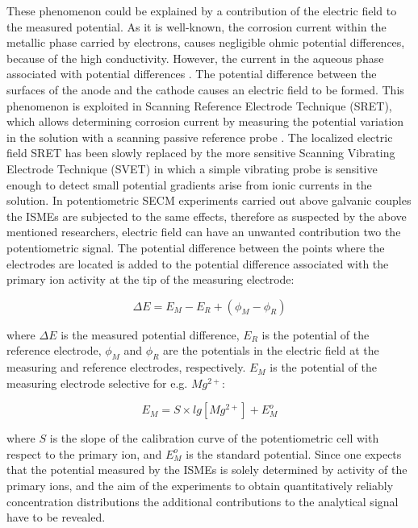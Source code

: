 \documentclass[3p]{elsarticle}
\begin{document}
These phenomenon could be explained by a contribution of the electric field to the measured potential. As it is well-known, the corrosion current within the metallic phase carried by electrons, causes negligible ohmic potential differences, because of the high conductivity. However, the current in the aqueous phase associated with potential differences \cite{Isaacsfield}. The potential difference between the surfaces of the anode and the cathode causes an electric field to be formed. This phenomenon is exploited in Scanning Reference Electrode Technique (SRET), which allows determining corrosion current by measuring the potential variation in the solution with a scanning passive reference probe \cite{SRET1, SRET2, SRET3, SRET4}. The localized electric field SRET has been slowly replaced by the more sensitive Scanning Vibrating Electrode Technique (SVET) in which a simple vibrating probe is sensitive enough to detect small potential gradients arise from ionic currents in the solution\cite{SVET}. In potentiometric SECM experiments carried out above galvanic couples the ISMEs are subjected to the same effects, therefore as suspected by the above mentioned researchers, electric field can have an unwanted contribution two the potentiometric signal. The potential difference between the points where the electrodes are located is added to the potential difference associated with the primary ion activity at the tip of the measuring electrode:

\begin{equation}
\Delta E=E_M-E_R + (\phi_M - \phi_R)
\label{eq:potential}
\end{equation}

where $\Delta E$ is the measured potential difference, $E_R$ is the potential of the reference electrode, $\phi_M$ and $\phi_R$ are the potentials in the electric field at the measuring and reference electrodes, respectively. $E_M$ is the potential of the measuring electrode selective for e.g. $Mg^{2+}$:

\begin{equation}
E_M = S \times lg[Mg^{2+}] + E_M^o
\label{eq:measuring}
\end{equation}

where $S$ is the slope of the calibration curve of the potentiometric cell with respect to the primary ion, and $E_M^o$ is the standard potential.
Since one expects that the potential measured by the ISMEs is solely determined by activity of the primary ions, and the aim of the experiments to obtain quantitatively reliably concentration distributions the additional contributions to the analytical signal have to be revealed.
\end{document}
